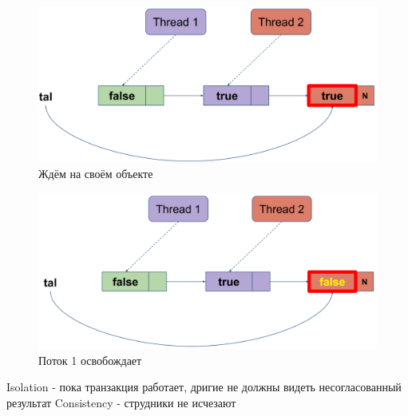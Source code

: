 \documentclass[10pt,a4paper,oneside,titlepage]{article}
\theoremstyle{plain}
\theoremstyle{defenition}
\begin{document}
\begin{figure}[h!]
	\centering
	\includegraphics[width=0.4\linewidth]{pictures/MCS10}
	\caption{Ждём на своём объекте}
	\label{fig:mcs10}
\end{figure}

\begin{figure}[h!]
	\centering
	\includegraphics[width=0.4\linewidth]{pictures/MCS11}
	\caption{Поток 1 освобождает}
	\label{fig:mcs11}
\end{figure}










Isolation - пока транзакция работает, дригие не должны видеть несогласованный результат
Consistency - струдники не исчезают
\end{document}
